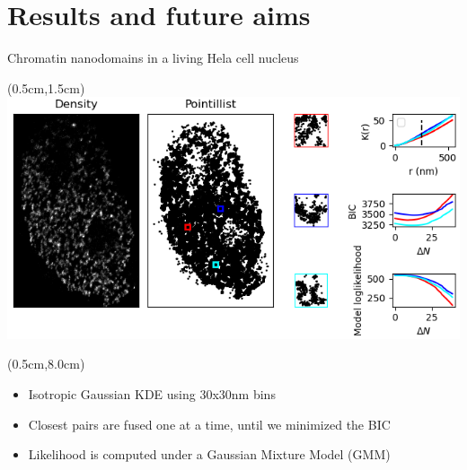\documentclass{beamer}					%
\begin{document}
\section{Results and future aims}
\begin{frame}{Chromatin nanodomains in a living Hela cell nucleus}

\begin{textblock*}{13cm}(0.5cm,1.5cm)
\includegraphics[width=\textwidth]{Cluster.png}
\end{textblock*}

\begin{textblock*}{13cm}(0.5cm,8.0cm)
\begin{itemize}
\item Isotropic Gaussian KDE using 30x30nm bins
\item Closest pairs are fused one at a time, until we minimized the BIC
\item Likelihood is computed under a Gaussian Mixture Model (GMM)
\end{itemize}
\end{textblock*}

\end{frame}

\end{document}
